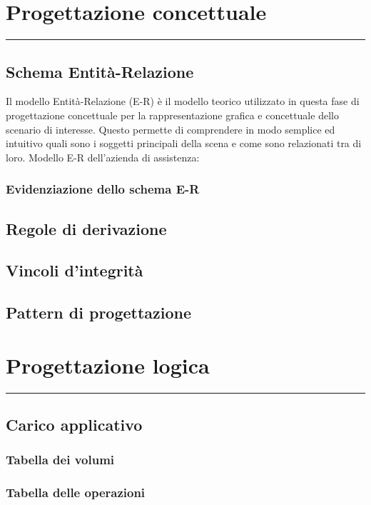 \documentclass[legalpaper]{article}
\begin{document}
\newpage
\section{Progettazione concettuale}
\rule{\linewidth}{1.5pt}
\subsection{Schema Entità-Relazione}
Il modello Entità-Relazione (E-R) è il modello teorico utilizzato in questa fase di progettazione concettuale per la rappresentazione grafica e concettuale dello scenario di interesse. Questo permette di comprendere in modo semplice ed intuitivo quali sono i soggetti principali della scena e come sono relazionati tra di loro. 
Modello E-R dell'azienda di assistenza:
\subsubsection{Evidenziazione dello schema E-R}

\subsection{Regole di derivazione}

\subsection{Vincoli d'integrità}

\subsection{Pattern di progettazione}

\newpage
\section{Progettazione logica}
\rule{\linewidth}{1.5pt}

\subsection{Carico applicativo}
\subsubsection{Tabella dei volumi}
\subsubsection{Tabella delle operazioni}
\end{document}
